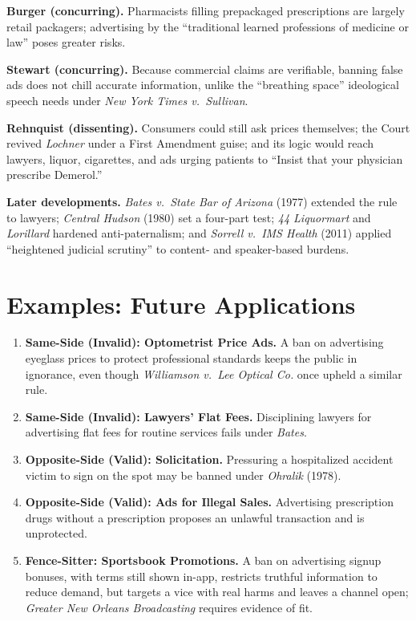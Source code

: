 \documentclass[12pt]{article}
\begin{document}
\textbf{Burger (concurring).} Pharmacists filling prepackaged prescriptions are largely retail packagers; advertising by the ``traditional learned professions of medicine or law'' poses greater risks.

\textbf{Stewart (concurring).} Because commercial claims are verifiable, banning false ads does not chill accurate information, unlike the ``breathing space'' ideological speech needs under \textit{New York Times v.\ Sullivan}.

\textbf{Rehnquist (dissenting).} Consumers could still ask prices themselves; the Court revived \textit{Lochner} under a First Amendment guise; and its logic would reach lawyers, liquor, cigarettes, and ads urging patients to ``Insist that your physician prescribe Demerol.''

\textbf{Later developments.} \textit{Bates v.\ State Bar of Arizona} (1977) extended the rule to lawyers; \textit{Central Hudson} (1980) set a four-part test; \textit{44 Liquormart} and \textit{Lorillard} hardened anti-paternalism; and \textit{Sorrell v.\ IMS Health} (2011) applied ``heightened judicial scrutiny'' to content- and speaker-based burdens.

\section{Examples: Future Applications}

\begin{enumerate}
\item \textbf{Same-Side (Invalid): Optometrist Price Ads.} A ban on advertising eyeglass prices to protect professional standards keeps the public in ignorance, even though \textit{Williamson v.\ Lee Optical Co.} once upheld a similar rule.
\item \textbf{Same-Side (Invalid): Lawyers' Flat Fees.} Disciplining lawyers for advertising flat fees for routine services fails under \textit{Bates}.
\item \textbf{Opposite-Side (Valid): Solicitation.} Pressuring a hospitalized accident victim to sign on the spot may be banned under \textit{Ohralik} (1978).
\item \textbf{Opposite-Side (Valid): Ads for Illegal Sales.} Advertising prescription drugs without a prescription proposes an unlawful transaction and is unprotected.
\item \textbf{Fence-Sitter: Sportsbook Promotions.} A ban on advertising signup bonuses, with terms still shown in-app, restricts truthful information to reduce demand, but targets a vice with real harms and leaves a channel open; \textit{Greater New Orleans Broadcasting} requires evidence of fit.
\end{enumerate}
\end{document}
